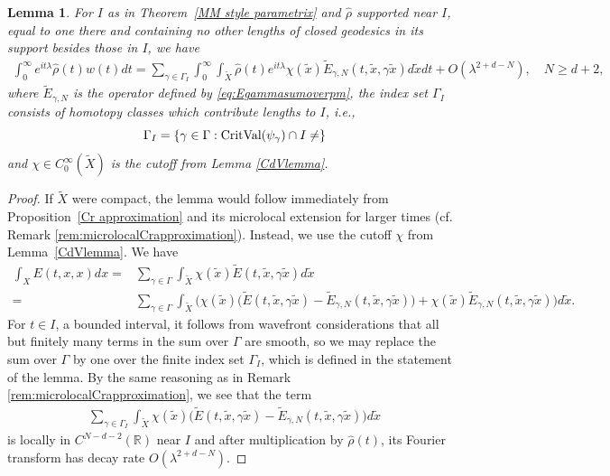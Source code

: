 \documentclass[11pt,letterpaper,oneside]{amsart}
\newcommand{\R}{\mathbb{R}}
\newtheorem{lemm}[theo]{Lemma}
\theoremstyle{definition}
\theoremstyle{remark}
\newcommand{\wt}{\widetilde}
\newcommand{\wh}{\widehat}
\theoremstyle{definition}
\theoremstyle{remark}
\begin{document}
\begin{lemm}\label{lemma:int over diag}
    For $I$ as in Theorem~\ref{MM style parametrix} and $\wh{\rho}$ supported near $I$, equal to one there and containing no other lengths of closed geodesics in its support besides those in $I$, we have
    \begin{align}
        \int_0^\infty e^{i t \lambda} \wh{\rho}(t) w(t) dt = \sum_{\gamma \in \Gamma_I} \int_0^\infty\int_{\wt X} \wh \rho(t) e^{i t \lambda} \chi(\wt x) \wt E_{\gamma, N}(t,\wt x, \gamma\wt x) d\wt x dt + O(\lambda^{2 + d - N}), \quad N \geq d + 2,
    \end{align}
    where $\wt E_{\gamma,N}$ is the operator defined by \eqref{eq:Egammasumoverpm}, the index set $\Gamma_I$ consists of homotopy classes which contribute lengths to $I$, i.e., 
    $$
    \Gamma_I = \{\gamma \in \Gamma : \text{CritVal}(\psi_\gamma) \cap I \neq \empty\}
    $$
    and
    $\chi \in C_0^\infty(\wt X)$ is the cutoff from Lemma \ref{CdVlemma}.
\end{lemm}

\begin{proof}
    If $\wt X$ were compact, the lemma would follow immediately from Proposition~\ref{Cr approximation} and its microlocal extension for larger times (cf. Remark \ref{rem:microlocalCrapproximation}). Instead, we use the cutoff $\chi$ from Lemma~\ref{CdVlemma}. We have
    \begin{align*}
        \int_X E(t,x,x) dx =& \sum_{\gamma \in \Gamma} \int_{\wt X} \chi(\wt x) \wt E (t, \wt x, \gamma \wt x) d \wt x\\
        =& \sum_{\gamma \in \Gamma} \int_{\wt X}\Bigg(  \chi(\wt x) \big(\wt E(t, \wt x, \gamma \wt x) - \wt E_{\gamma,N}(t, \wt x, \gamma \wt x)\big)
         + \chi(\wt x) \wt E_{\gamma,N}(t, \wt x, \gamma \wt x)  \Bigg) d \wt x.
    \end{align*}
	For $t \in I$, a bounded interval, it follows from wavefront considerations that all but finitely many terms in the sum over $\Gamma$ are smooth, so we may replace the sum over $\Gamma$ by one over the finite index set $\Gamma_I$, which is defined in the statement of the lemma. By the same reasoning as in Remark \ref{rem:microlocalCrapproximation}, we see that the term
	\begin{align*}
		\sum_{\gamma \in \Gamma_I} \int_{\wt X} \chi(\wt x) \big(\wt E(t, \wt x, \gamma \wt x) - \wt E_{\gamma,N}(t, \wt x, \gamma \wt x)\big) d \wt x
	\end{align*}
	is locally in $C^{N - d - 2}(\R)$ near $I$ and after multiplication by $\wh \rho(t)$, its Fourier transform has decay rate $O(\lambda^{2 + d - N})$.
\end{proof}
\end{document}
